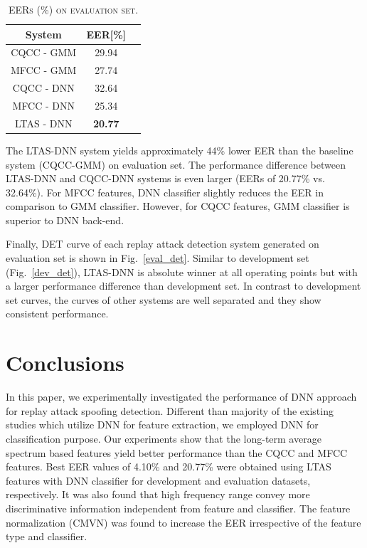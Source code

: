 \documentclass{article}
\begin{document}
\begin{table}[h]
    \centering
    \caption{\textsc{EERs (\%) on evaluation set.}}
    \vspace{2mm}
    \label{eval_res}
    \begin{tabular}{|c|c|c|}
        \hline
        System     & EER[\%]        \\ \hline
        CQCC - GMM & 29.94          \\
        MFCC - GMM & 27.74          \\
        CQCC - DNN & 32.64          \\
        MFCC - DNN & 25.34          \\
        LTAS - DNN & \textbf{20.77} \\
        \hline
    \end{tabular}
\end{table}

The LTAS-DNN system yields approximately 44\% lower EER than the baseline system (CQCC-GMM) on evaluation set. The
performance difference between LTAS-DNN and CQCC-DNN systems is even larger (EERs of 20.77\% vs. 32.64\%). For MFCC
features, DNN classifier slightly reduces the EER in comparison to GMM classifier. However, for CQCC features, GMM
classifier is superior to DNN back-end.

Finally, DET curve of each replay attack detection system generated on evaluation set is shown in Fig.~\ref{eval_det}.
Similar to development set (Fig.~\ref{dev_det}), LTAS-DNN is absolute winner at all operating points but with a larger
performance difference than development set. In contrast to development set curves, the curves of other systems are
well separated and they show consistent performance.

\section{Conclusions}
\label{sec:conc}
In this paper, we experimentally investigated the performance of DNN approach for replay attack spoofing detection.
Different than majority of the existing studies which utilize DNN for feature extraction, we employed DNN for
classification purpose. Our experiments show that the long-term average spectrum based features yield better
performance than the CQCC and MFCC features. Best EER values of 4.10\% and 20.77\% were obtained using LTAS features
with DNN classifier for development and evaluation datasets, respectively. It was also found that high frequency range
convey more discriminative information independent from feature and classifier. The feature normalization (CMVN) was
found to increase the EER irrespective of the feature type and classifier.
\end{document}
